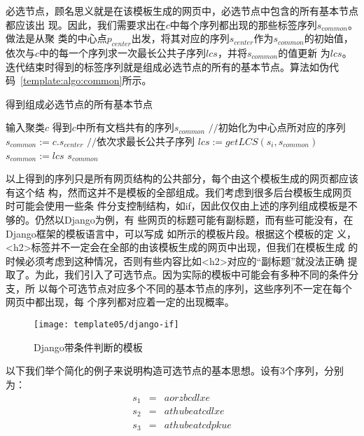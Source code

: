 必选节点，顾名思义就是在该模板生成的网页中，必选节点中包含的所有基本节点都应该出
现。因此，我们需要求出在$c$中每个序列都出现的那些标签序列$s_{common}$。做法是从聚
类的中心点$p_{center}$出发，将其对应的序列$s_{center}$作为$s_{common}$的初始值，
依次与$c$中的每一个序列求一次最长公共子序列$lcs$，并将$s_{common}$的值更新
为$lcs$。迭代结束时得到的标签序列就是组成必选节点的所有的基本节点。算法如伪代
码~\ref{template:algo:common}所示。
\begin{algorithm}
  \caption{得到组成必选节点的所有基本节点}
  \label{template:algo:common}
  \begin{algorithmic}[1]
    \Require 输入聚类$c$
    \Ensure 得到$c$中所有文档共有的序列$s_{common}$
    \State $//$初始化为中心点所对应的序列
    \State $s_{common} := c.s_{center}$
    \State $//$依次求最长公共子序列
    \State $lcs := getLCS(s_i, s_{common})$
    \State $s_{common} := lcs$
    \EndFor
    \State \Return $s_{common}$
    \EndFunction
  \end{algorithmic}
\end{algorithm}

以上得到的序列只是所有网页结构的公共部分，每个由这个模板生成的网页都应该有这个结
构，然而这并不是模板的全部组成。我们考虑到很多后台模板生成网页时可能会使用一些条
件分支控制结构，如if，因此仅仅由上述的序列组成模板是不够的。仍然以Django为例，有
些网页的标题可能有副标题，而有些可能没有，在Django框架的模板语言中，可以写成
如所示的模板片段。根据这个模板的定
义，<h2>标签并不一定会在全部的由该模板生成的网页中出现，但我们在模板生成
的时候必须考虑到这种情况，否则有些内容比如{<h2>}对应的“副标题”就没法正确
提取了。为此，我们引入了可选节点。因为实际的模板中可能会有多种不同的条件分支，所
以每个可选节点对应多个不同的基本节点的序列，这些序列不一定在每个网页中都出现，每
个序列都对应着一定的出现概率。

\begin{figure}
  \centering
  \texttt{[image: template05/django-if]}
  \caption{Django带条件判断的模板}
  \label{template:fig:django-if}
\end{figure}

以下我们举个简化的例子来说明构造可选节点的基本思想。设有3个序列，分别为：
\begin{eqnarray*}
s_1&=&aorzbcdlxe\\
s_2&=&athubeatcdlxe\\
s_3&=&athubeatcdpkue
\end{eqnarray*}


